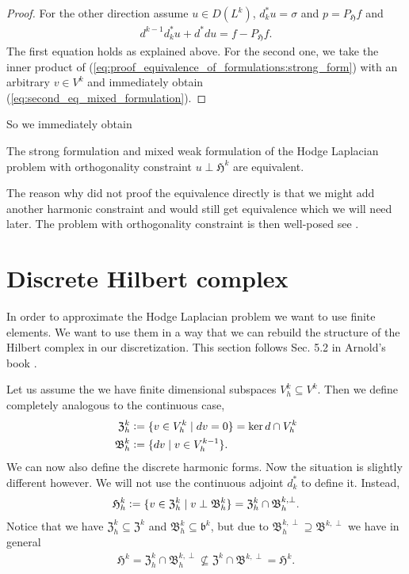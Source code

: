 \documentclass[../master_thesis.tex]{subfiles}
\begin{document}
\begin{proof}
    For the other direction assume $u \in D(L^k)$, $d^*_k u = \sigma$ and $p= P_\mathfrak{H} f$
    and 
    \begin{align}
        d^{k-1} d^*_k u + d^* du  = f - P_\mathfrak{H}f.\label{eq:proof_equivalence_of_formulations:strong_form}
    \end{align}    
    The first equation 
    holds as explained above. For the second one, we take the inner product of 
    (\ref{eq:proof_equivalence_of_formulations:strong_form}) with an arbitrary 
    $v \in V^k$ and immediately obtain (\ref{eq:second_eq_mixed_formulation}).
\end{proof}
So we immediately obtain 

\begin{corollary}
    The strong formulation and mixed weak formulation of the Hodge Laplacian problem 
    with orthogonality constraint $u \perp \mathfrak{H}^k$ are equivalent.
\end{corollary}
The reason why did not proof the equivalence directly is that we might add another 
harmonic constraint and would still get equivalence which we will need later. 
The problem with orthogonality constraint is then well-posed see \cite{}.


\section{Discrete Hilbert complex}

In order to approximate the Hodge Laplacian problem we want to use finite elements.
We want to use them in a way that we can rebuild the structure of the Hilbert complex 
in our discretization. This section follows Sec. 5.2 in Arnold's book \cite{arnold}.

Let us assume the we have finite dimensional subspaces $V_h^k \subseteq V^k$. 
Then we define completely analogous to the continuous case,
\begin{align*}
    \mathfrak{Z}_h^k &\vcentcolon= \{ v \in V_h^k \mid d v = 0 \} = \ker d \cap V^k_h
    \\ \mathfrak{B}^k_h &\vcentcolon= \{ dv \mid v \in V_h^{k-1} \}.
\end{align*}
We can now also define the discrete harmonic forms. Now the situation is slightly 
different however. We will not use the continuous adjoint $d^*_k$ to define it.
Instead,
\begin{align*}
    \mathfrak{H}_h^k \vcentcolon= \{ v \in \mathfrak{Z}_h^k \mid v \perp \mathfrak{B}^k_h \}
        = \mathfrak{Z}_h^k \cap \mathfrak{B}_h^{k,\perp}.
\end{align*}
Notice that we have $\mathfrak{Z}_h^k \subseteq \mathfrak{Z}^k$ and 
$\mathfrak{B}_h^k \subseteq \mathfrak{b}^k$, but due to 
$\mathfrak{B}_h^{k,\perp} \supseteq \mathfrak{B}^{k,\perp}$ we have in general
\begin{align*}
    \mathfrak{H}^k = \mathfrak{Z}_h^k \cap \mathfrak{B}_h^{k,\perp} 
    \not\subseteq    \mathfrak{Z}^k \cap \mathfrak{B}^{k,\perp} = \mathfrak{H}^k.
\end{align*}
\end{document}
